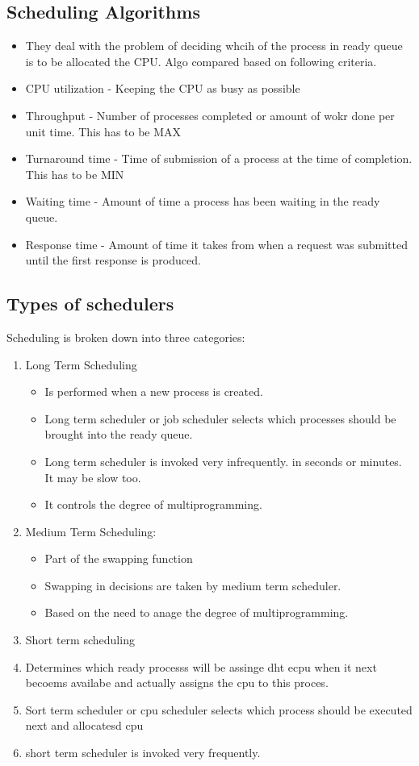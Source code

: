 \documentclass[11pt]{article}
\begin{document}
\subsection{Scheduling Algorithms}

\begin{itemize}
	\item They deal with the problem of deciding whcih of the process in ready queue is to be allocated the CPU. Algo compared based on following criteria. 
	\item CPU utilization - Keeping the CPU as busy as possible
	\item Throughput - Number of processes completed or amount of wokr done per unit time. This has to be MAX
	\item Turnaround time - Time of submission of a process at the time of completion. This has to be MIN
	\item Waiting time - Amount of time a process has been waiting in the ready queue. 
	\item Response time - Amount of time it takes from when a request was submitted until the first response is produced. 
\end{itemize}

\subsection{Types of schedulers}
Scheduling is broken down into three categories: 
\begin{enumerate}
	\item Long Term Scheduling
	\begin{itemize}
		\item Is performed when a new process is created. 
		\item Long term scheduler or job scheduler selects which processes should be brought into the ready queue. 
		\item Long term scheduler is invoked very infrequently. in seconds or minutes. It may be slow too. 
		\item It controls the degree of multiprogramming. 
	\end{itemize}
	\item Medium Term Scheduling: 
	\begin{itemize}
		\item Part of the swapping function
		\item Swapping in decisions are taken by medium term scheduler. 
		\item Based on the need to anage the degree of multiprogramming.  
	\end{itemize}

	\item Short term scheduling
	\item Determines which ready processs will be assinge dht ecpu when it next becoems availabe and actually assigns the cpu to this proces. 
	\item Sort term scheduler or cpu scheduler selects which process should be executed next and allocatesd cpu
	\item short term scheduler is invoked very frequently. 
\end{enumerate}
\end{document}
